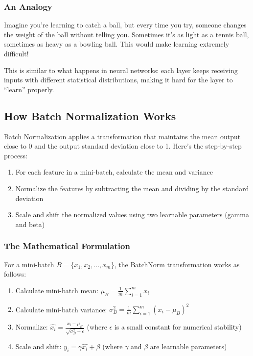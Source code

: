 \documentclass[
  letterpaper,
  DIV=11,
  numbers=noendperiod]{scrreprt}
\providecommand{\tightlist}{%
  \setlength{\itemsep}{0pt}\setlength{\parskip}{0pt}}\usepackage{longtable,booktabs,array}
\begin{document}
\subsubsection{An Analogy}\label{an-analogy}

Imagine you're learning to catch a ball, but every time you try, someone
changes the weight of the ball without telling you. Sometimes it's as
light as a tennis ball, sometimes as heavy as a bowling ball. This would
make learning extremely difficult!

This is similar to what happens in neural networks: each layer keeps
receiving inputs with different statistical distributions, making it
hard for the layer to ``learn'' properly.

\subsection{How Batch Normalization
Works}\label{how-batch-normalization-works}

Batch Normalization applies a transformation that maintains the mean
output close to 0 and the output standard deviation close to 1. Here's
the step-by-step process:

\begin{enumerate}
\def\labelenumi{\arabic{enumi}.}
\tightlist
\item
  For each feature in a mini-batch, calculate the mean and variance
\item
  Normalize the features by subtracting the mean and dividing by the
  standard deviation
\item
  Scale and shift the normalized values using two learnable parameters
  (gamma and beta)
\end{enumerate}

\subsubsection{The Mathematical
Formulation}\label{the-mathematical-formulation}

For a mini-batch \(B = \{x_1, x_2, ..., x_m\}\), the BatchNorm
transformation works as follows:

\begin{enumerate}
\def\labelenumi{\arabic{enumi}.}
\tightlist
\item
  Calculate mini-batch mean: \(\mu_B = \frac{1}{m}\sum_{i=1}^{m}x_i\)
\item
  Calculate mini-batch variance:
  \(\sigma_B^2 = \frac{1}{m}\sum_{i=1}^{m}(x_i - \mu_B)^2\)
\item
  Normalize:
  \(\hat{x_i} = \frac{x_i - \mu_B}{\sqrt{\sigma_B^2 + \epsilon}}\)
  (where \(\epsilon\) is a small constant for numerical stability)
\item
  Scale and shift: \(y_i = \gamma\hat{x_i} + \beta\) (where \(\gamma\)
  and \(\beta\) are learnable parameters)
\end{enumerate}
\end{document}
